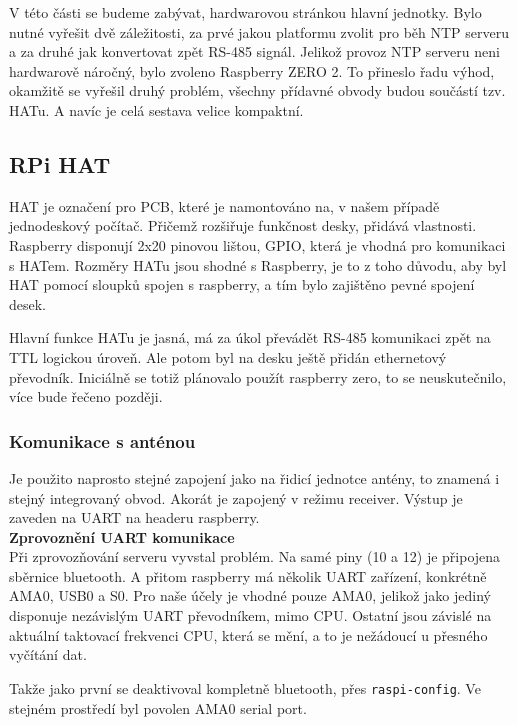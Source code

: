    V této části se budeme zabývat, hardwarovou stránkou hlavní jednotky. Bylo nutné
    vyřešit dvě záležitosti, za prvé jakou platformu zvolit pro běh NTP serveru a za druhé
    jak konvertovat zpět RS-485 signál. Jelikož provoz NTP serveru neni hardwarově
    náročný, bylo zvoleno Raspberry ZERO 2. To přineslo řadu výhod, okamžitě se vyřešil
    druhý problém, všechny přídavné obvody budou součástí tzv. HATu. A navíc je celá
    sestava velice kompaktní.
\subsection{RPi HAT}
    HAT je označení pro PCB, které je namontováno na, v našem případě jednodeskový
    počítač. Přičemž rozšiřuje funkčnost desky, přidává vlastnosti. Raspberry disponují
    2x20 pinovou lištou, GPIO, která je vhodná pro komunikaci s HATem. Rozměry HATu jsou
    shodné s Raspberry, je to z toho důvodu, aby byl HAT pomocí sloupků spojen s
    raspberry, a tím bylo zajištěno pevné spojení desek.

    Hlavní funkce HATu je jasná, má za úkol převádět RS-485 komunikaci zpět na TTL
    logickou úroveň. Ale potom byl na desku ještě přidán ethernetový převodník. Iniciálně
    se totiž plánovalo použít raspberry zero, to se neuskutečnilo, více bude řečeno
    později.
\subsubsection{Komunikace s anténou}

    Je použito naprosto stejné zapojení jako na řidicí jednotce antény, to znamená i
    stejný integrovaný obvod. Akorát je zapojený v režimu receiver. Výstup je zaveden na
    UART na headeru raspberry.
\\

\textbf{Zprovoznění UART komunikace}
\\

    Při zprovozňování serveru vyvstal problém. Na samé piny (10 a 12) je připojena
    sběrnice bluetooth. A přitom raspberry má několik UART zařízení, konkrétně AMA0,
    USB0 a S0. Pro naše účely je vhodné pouze AMA0, jelikož jako jediný disponuje
    nezávislým UART převodníkem, mimo CPU. Ostatní jsou závislé na aktuální taktovací
    frekvenci CPU, která se mění, a to je nežádoucí u přesného vyčítání dat.

    Takže jako první se deaktivoval kompletně bluetooth, přes \verb|raspi-config|. Ve
    stejném prostředí byl povolen AMA0 serial port.

